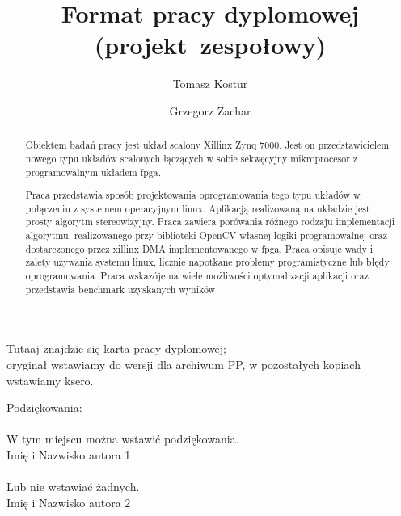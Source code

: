 \documentclass[english, polish, bachelor, a4paper,oneside]{ppciethesis} %
\author{Tomasz Kostur \and Grzegorz Zachar} %
\title{Format pracy dyplomowej (projekt~zespołowy)} %
\begin{document}


\frontmatter\pagestyle{empty}%
\maketitle
\cleardoublepage%
\Large

\thispagestyle{empty}\vspace*{\fill}
\cleardoublepage

\thispagestyle{empty}\vspace*{\fill}%
\begin{center}Tutaaj znajdzie się karta pracy dyplomowej;\\oryginał wstawiamy do wersji dla archiwum PP, w pozostałych kopiach wstawiamy ksero.\end{center}%
\vfill
\cleardoublepage

\noindent
Podziękowania:\\ \\
\noindent
W tym miejscu można wstawić podziękowania.\\
Imię i Nazwisko autora 1
\\ \\
\noindent
Lub nie wstawiać żadnych.\\
Imię i Nazwisko autora 2
\\
\cleardoublepage
\thispagestyle{empty}\vspace*{\fill}
\cleardoublepage

\pagestyle{ppfcmthesis}%
\tableofcontents* \cleardoublepage%

\begin{abstract}
Obiektem badań pracy jest układ scalony Xillinx Zynq 7000.
Jest on przedstawicielem nowego typu układów scalonych łączących w sobie
sekwęcyjny mikroprocesor z programowalnym układem fpga.

Praca przedstawia sposób projektowania oprogramowania tego typu układów w połączeniu
z systemem operacyjnym linux.
Aplikacją realizowaną na układzie jest prosty algorytm stereowizyjny.
Praca zawiera porówania różnego rodzaju implementacji algorytmu, realizowanego
przy biblioteki OpenCV własnej logiki programowalnej oraz dostarczonego przez
xillinx DMA implementowanego w fpga. Praca opisuje wady i zalety używania
systemu linux, licznie napotkane problemy programistyczne lub błędy oprogramowania.
Praca wskazóje na wiele możliwości optymalizacji aplikacji oraz przedstawia benchmark
uzyskanych wyników
\end{abstract}
\end{document}
